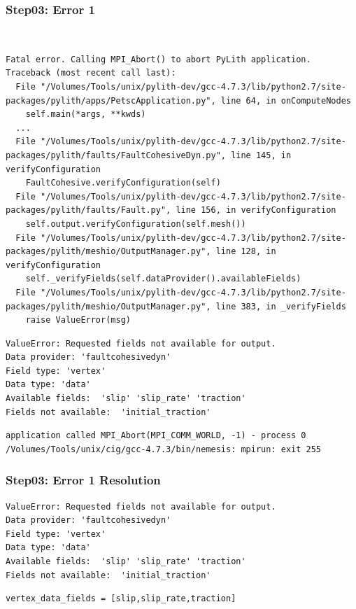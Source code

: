 \documentclass{beamer}
\begin{document}
\begin{frame}[fragile]
  \frametitle{Step03: Error 1}

\\
\begin{lstlisting}
Fatal error. Calling MPI_Abort() to abort PyLith application.
Traceback (most recent call last):
  File "/Volumes/Tools/unix/pylith-dev/gcc-4.7.3/lib/python2.7/site-packages/pylith/apps/PetscApplication.py", line 64, in onComputeNodes
    self.main(*args, **kwds)
  ...
  File "/Volumes/Tools/unix/pylith-dev/gcc-4.7.3/lib/python2.7/site-packages/pylith/faults/FaultCohesiveDyn.py", line 145, in verifyConfiguration
    FaultCohesive.verifyConfiguration(self)
  File "/Volumes/Tools/unix/pylith-dev/gcc-4.7.3/lib/python2.7/site-packages/pylith/faults/Fault.py", line 156, in verifyConfiguration
    self.output.verifyConfiguration(self.mesh())
  File "/Volumes/Tools/unix/pylith-dev/gcc-4.7.3/lib/python2.7/site-packages/pylith/meshio/OutputManager.py", line 128, in verifyConfiguration
    self._verifyFields(self.dataProvider().availableFields)
  File "/Volumes/Tools/unix/pylith-dev/gcc-4.7.3/lib/python2.7/site-packages/pylith/meshio/OutputManager.py", line 383, in _verifyFields
    raise ValueError(msg)
\end{lstlisting}
\begin{lstlisting}
ValueError: Requested fields not available for output.
Data provider: 'faultcohesivedyn'
Field type: 'vertex'
Data type: 'data'
Available fields:  'slip' 'slip_rate' 'traction'
Fields not available:  'initial_traction'
\end{lstlisting}
\begin{lstlisting}
application called MPI_Abort(MPI_COMM_WORLD, -1) - process 0
/Volumes/Tools/unix/cig/gcc-4.7.3/bin/nemesis: mpirun: exit 255
\end{lstlisting}

\end{frame}


\begin{frame}[fragile]
  \frametitle{Step03: Error 1 Resolution}

\begin{lstlisting}
ValueError: Requested fields not available for output.
Data provider: 'faultcohesivedyn'
Field type: 'vertex'
Data type: 'data'
Available fields:  'slip' 'slip_rate' 'traction'
Fields not available:  'initial_traction'
\end{lstlisting}\pause
{}
\begin{lstlisting}
vertex_data_fields = [slip,slip_rate,traction]
\end{lstlisting}

\end{frame}
\end{document}
